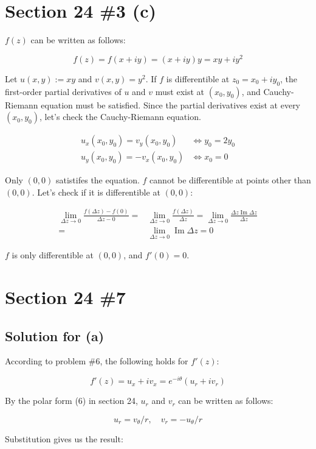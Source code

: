 \documentclass{scrartcl}
\begin{document}
\section{Section 24 \#3 (c)}
\(f(z)\) can be written as follows:

\[
  f(z) = f(x + iy) = (x + iy)y = xy + iy^2
\]

Let \(u(x, y) := xy\) and \(v(x, y) = y^2\). If \(f\) is differentible at \(z_0 = x_0 + iy_0\), the first-order partial derivatives of \(u\) and \(v\) must exist at \((x_0, y_0)\), and Cauchy-Riemann equation must be satisfied. Since the partial derivatives exist at every \((x_0, y_0)\), let's check the Cauchy-Riemann equation.

\begin{align*}
  u_x(x_0, y_0) = v_y(x_0, y_0) &\Longleftrightarrow y_0 = 2y_0 \\
  u_y(x_0, y_0) = -v_x(x_0, y_0) &\Longleftrightarrow x_0 = 0
\end{align*}

Only \((0, 0)\) satistifes the equation. \(f\) cannot be differentible at points other than \((0, 0)\). Let's check if it is differentible at \((0, 0)\):

\begin{align*}
  \lim_{\Delta z \to 0} \frac{f(\Delta z) - f(0)}{\Delta z - 0} =& \lim_{\Delta z \to 0} \frac{f(\Delta z)}{\Delta z} = \lim_{\Delta z \to 0} \frac{\Delta z \operatorname{Im} \Delta z}{\Delta z} \\
  =& \lim_{\Delta z \to 0} \operatorname{Im} \Delta z = 0
\end{align*}

\(f\) is only differentible at \((0, 0)\), and \(f'(0) = 0\).

\section{Section 24 \#7}
\subsection{Solution for (a)}
According to problem \#6, the following holds for \(f'(z)\):

\[
  f'(z) = u_x + iv_x = e^{-i\theta} (u_r + iv_r)
\]

By the polar form (6) in section 24, \(u_r\) and \(v_r\) can be written as follows:

\[
  u_r = v_\theta / r, \quad v_r = -u_\theta / r
\]

Substitution gives us the result:
\end{document}
